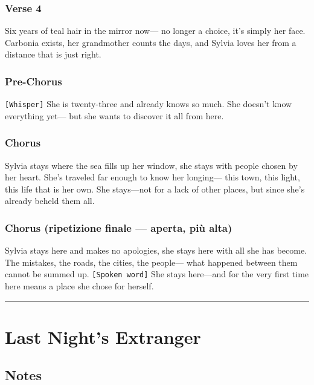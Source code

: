 \subsubsection{Verse 4}\label{verse-4-10}

Six years of teal hair in the mirror now--- no longer a choice, it's
simply her face. Carbonia exists, her grandmother counts the days, and
Sylvia loves her from a distance that is just right.

\subsubsection{Pre-Chorus}\label{pre-chorus-36}

\texttt{{[}Whisper{]}} She is twenty-three and already knows so much.
She doesn't know everything yet--- but she wants to discover it all from
here.

\subsubsection{Chorus}\label{chorus-51}

Sylvia stays where the sea fills up her window, she stays with people
chosen by her heart. She's traveled far enough to know her longing---
this town, this light, this life that is her own. She stays---not for a
lack of other places, but since she's already beheld them all.

\subsubsection{Chorus (ripetizione finale --- aperta, più
alta)}\label{chorus-ripetizione-finale-aperta-piuxf9-alta-1}

Sylvia stays here and makes no apologies, she stays here with all she
has become. The mistakes, the roads, the cities, the people--- what
happened between them cannot be summed up. \texttt{{[}Spoken\ word{]}}
She stays here---and for the very first time here means a place she
chose for herself.

\begin{center}\rule{0.5\linewidth}{0.5pt}\end{center}

\section{Last Night's Extranger}\label{last-nights-extranger}

\subsection{Notes}\label{notes-21}

